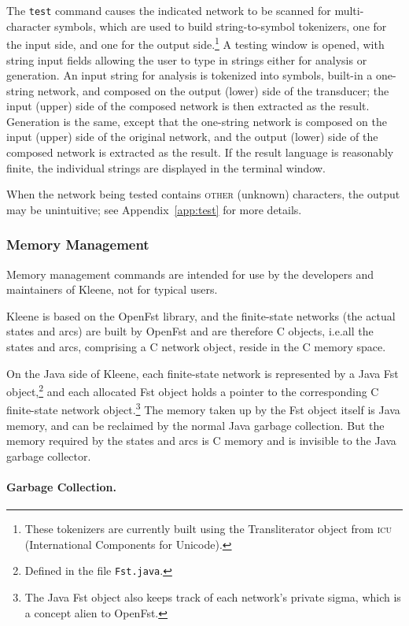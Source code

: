 \documentclass[letterpaper,12pt]{article}
\newcommand{\acro}{\textsc}
\def\CPP{{C\nolinebreak[4]\hspace{-.08em}\raisebox{.3ex}{\footnotesize\bf
+}\nolinebreak\hspace{-.1em}\raisebox{.3ex}{\footnotesize\bf +}}}
\begin{document}
\noindent
The \texttt{test} command causes the indicated network to be scanned for
multi-character symbols, which are used to build 
string-to-symbol tokenizers, one for the input side, and one for
the output side.\footnote{These tokenizers are currently
built using the Transliterator object from \acro{icu} (International
Components for Unicode).}  A testing window is opened, with string
input fields allowing the user to type in strings either for
analysis or generation.  An input string for analysis is tokenized
into symbols, built-in a one-string network, and composed on the
output (lower) side of the transducer; the input (upper) side of
the composed network is then extracted as the result.  Generation
is the same, except that the one-string network is composed on the
input (upper) side of the original network, and the output (lower)
side of the composed network is extracted as the result.  If the
result language is reasonably finite, the individual strings are
displayed in the terminal window.

When the network being tested contains \acro{other} (unknown) characters,
the output may be unintuitive; see Appendix~\ref{app:test} for more
details.

\subsubsection{Memory Management}

Memory management commands are intended for use by the developers and
maintainers of Kleene, not for typical users.

Kleene is based on the OpenFst library, and the finite-state networks
(the actual states and arcs) are built by OpenFst and are therefore
\CPP{} objects, i.e.\@ all the states and arcs, comprising a \CPP{}
network object, reside in the \CPP{} memory space.

On the Java side of Kleene, each finite-state network is represented by a
Java Fst object,\footnote{Defined in the file \texttt{Fst.java}.} and
each allocated Fst object holds a pointer to the corresponding \CPP{}
finite-state network object.\footnote{The Java Fst object also keeps
track of each network's private sigma, which is a concept alien to
OpenFst.}  The memory taken up by the Fst object itself is Java memory,
and can be reclaimed by the normal Java garbage collection.  But the
memory required by the states and arcs is \CPP{} memory and is invisible
to the Java garbage collector.

\paragraph{Garbage Collection.}
\end{document}
